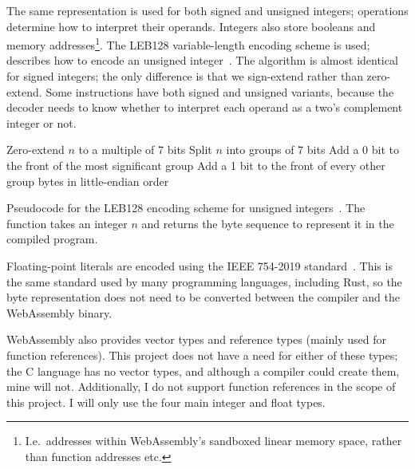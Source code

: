 \documentclass[00-main.tex]{subfiles}
\begin{document}
The same representation is used for both signed and unsigned integers; operations determine how to interpret their operands.
Integers also store booleans and memory addresses\footnote{I.e.\ addresses within WebAssembly's sandboxed linear memory space, rather than function addresses etc.}.
The LEB128 variable-length encoding scheme is used;  describes how to encode an unsigned integer~.
The algorithm is almost identical for signed integers; the only difference is that we sign-extend rather than zero-extend.
Some instructions have both signed and unsigned variants, because the decoder needs to know whether to interpret each operand as a two's complement integer or not.

\begin{listing}[t]
  \begin{PseudocodeListing}
      \State Zero-extend $n$ to a multiple of 7 bits
      \State Split $n$ into groups of 7 bits
      \State Add a 0 bit to the front of the most significant group
      \State Add a 1 bit to the front of every other group
      \State \Return bytes in little-endian order
    \EndFunction
  \end{PseudocodeListing}
  \caption{Pseudocode for the LEB128 encoding scheme for unsigned integers~. The function takes an integer $n$ and returns the byte sequence to represent it in the compiled program.}
  \label{lst:leb128 pseudocode}
\end{listing}

Floating-point literals are encoded using the IEEE 754-2019 standard~. %
This is the same standard used by many programming languages, including Rust, so the byte representation does not need to be converted between the compiler and the WebAssembly binary.

WebAssembly also provides vector types and reference types (mainly used for function references).
This project does not have a need for either of these types; the C language has no vector types, and although a compiler could create them, mine will not.
Additionally, I do not support function references in the scope of this project.
I will only use the four main integer and float types.
\end{document}
